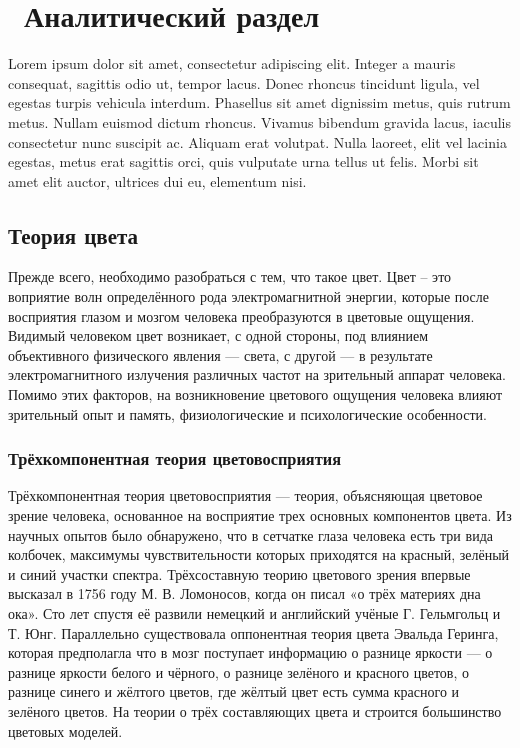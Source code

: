 \chapter{ Аналитический раздел}
\label{cha:analysis}

Lorem ipsum dolor sit amet, consectetur adipiscing elit. Integer a mauris consequat, sagittis odio ut, tempor lacus. Donec rhoncus tincidunt ligula, vel egestas turpis vehicula interdum. Phasellus sit amet dignissim metus, quis rutrum metus. Nullam euismod dictum rhoncus. Vivamus bibendum gravida lacus, iaculis consectetur nunc suscipit ac. Aliquam erat volutpat. Nulla laoreet, elit vel lacinia egestas, metus erat sagittis orci, quis vulputate urna tellus ut felis. Morbi sit amet elit auctor, ultrices dui eu, elementum nisi.



\section{Теория цвета}
Прежде всего, необходимо разобраться с тем, что такое цвет. Цвет -- это воприятие волн определённого рода электромагнитной энергии, которые после восприятия глазом и мозгом человека преобразуются в цветовые ощущения. Видимый человеком цвет возникает, с одной стороны, под влиянием объективного физического явления — света, с другой — в результате электромагнитного излучения различных частот на зрительный аппарат человека. Помимо этих факторов, на возникновение цветового ощущения человека влияют зрительный опыт и память, физиологические и психологические особенности.

\subsection{Трёхкомпонентная теория цветовосприятия}
Трёхкомпонентная теория цветовосприятия — теория, объясняющая цветовое зрение человека, основанное на восприятие трех основных компонентов цвета. Из научных опытов было обнаружено, что в сетчатке глаза человека есть три вида колбочек, максимумы чувствительности которых приходятся на красный, зелёный и синий участки спектра. \cite{b1}  Трёхсоставную теорию цветового зрения впервые высказал в 1756 году М. В. Ломоносов, когда он писал «о трёх материях дна ока». Сто лет спустя её развили немецкий и английский учёные Г. Гельмгольц и Т. Юнг. Параллельно существовала оппонентная теория цвета Эвальда Геринга, которая предполагла что в мозг поступает информацию о разнице яркости — о разнице яркости белого и чёрного, о разнице зелёного и красного цветов, о разнице синего и жёлтого цветов, где жёлтый цвет есть сумма красного и зелёного цветов.  На теории о трёх составляющих цвета и строится большинство цветовых моделей. 

